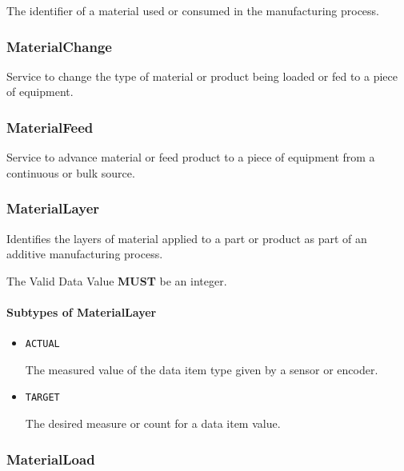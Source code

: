The identifier of a material used or consumed in the manufacturing process.


\subsubsection{MaterialChange}
\label{sec:MaterialChange}



Service to change the type of material or product being loaded or fed to a piece of equipment.


\subsubsection{MaterialFeed}
\label{sec:MaterialFeed}



Service to advance material or feed product to a piece of equipment from a continuous or bulk source.


\subsubsection{MaterialLayer}
\label{sec:MaterialLayer}



Identifies the layers of material applied to a part or product as part of an additive manufacturing process.
  
 The \gls{Valid Data Value} \textbf{MUST} be an integer.


\paragraph{Subtypes of MaterialLayer}\mbox{}
\label{sec:Subtypes of MaterialLayer}

\begin{itemize}

\item \texttt{ACTUAL}


The measured value of the data item type given by a sensor or encoder.

\item \texttt{TARGET}


The desired measure or count for a data item value.


\end{itemize}

\subsubsection{MaterialLoad}
\label{sec:MaterialLoad}



